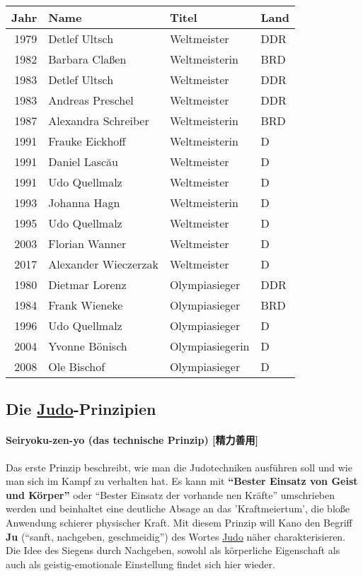 \documentclass[justified, a4paper, notitlepage, captions=tableheading, nobib]{tufte-handout}
\begin{document}
\begin{center}
\begin{tabular}{rlll}
\hline
Jahr & Name & Titel & Land\\
\hline
1979 & Detlef Ultsch & Weltmeister & DDR\\
1982 & Barbara Claßen & Weltmeisterin & BRD\\
1983 & Detlef Ultsch & Weltmeister & DDR\\
1983 & Andreas Preschel & Weltmeister & DDR\\
1987 & Alexandra Schreiber & Weltmeisterin & BRD\\
1991 & Frauke Eickhoff & Weltmeisterin & D\\
1991 & Daniel Lascău & Weltmeister & D\\
1991 & Udo Quellmalz & Weltmeister & D\\
1993 & Johanna Hagn & Weltmeisterin & D\\
1995 & Udo Quellmalz & Weltmeister & D\\
2003 & Florian Wanner & Weltmeister & D\\
2017 & Alexander Wieczerzak & Weltmeister & D\\
\hline
1980 & Dietmar Lorenz & Olympiasieger & DDR\\
1984 & Frank Wieneke & Olympiasieger & BRD\\
1996 & Udo Quellmalz & Olympiasieger & D\\
2004 & Yvonne Bönisch & Olympiasiegerin & D\\
2008 & Ole Bischof & Olympiasieger & D\\
\hline
\end{tabular}
\end{center}

\subsection{Die \hyperref[org6f56467]{Judo}-Prinzipien}
\label{sec:org143b75e}
\paragraph{\label{orgb17970b}Seiryoku-zen-yo (das technische Prinzip) [精力善用]}
\label{sec:org231767a}
Das erste Prinzip beschreibt, wie man die Judotechniken ausführen soll und wie man sich im Kampf zu verhalten hat. Es kann mit \textbf{"`Bester Einsatz von Geist und Körper"'} oder "`Bester Einsatz der vorhande
nen Kräfte"' umschrieben werden und beinhaltet eine deutliche Absage an das 'Kraftmeiertum', die bloße Anwendung schierer physischer Kraft. Mit diesem Prinzip will Kano den Begriff \textbf{Ju} ("`sanft, nachgeben, geschmeidig"') des Wortes \hyperref[org6f56467]{Judo} näher charakterisieren. Die Idee des Siegens durch Nachgeben, sowohl als körperliche Eigenschaft als auch als geistig-emotionale Einstellung findet sich hier wieder. 
\end{document}
